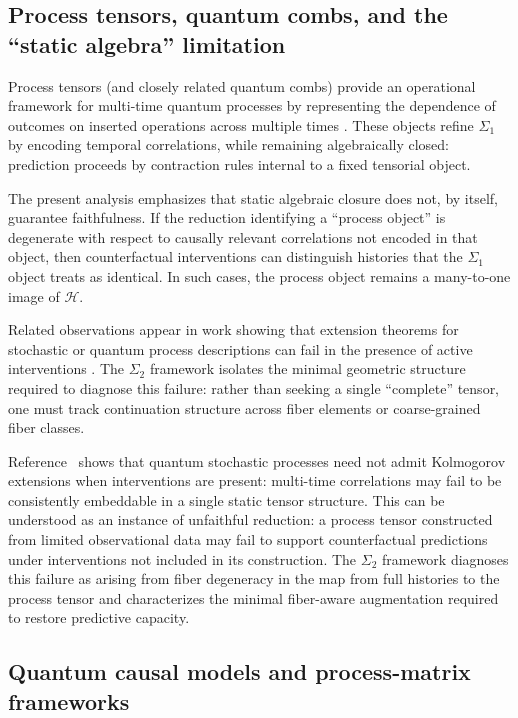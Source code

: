 \subsection{Process tensors, quantum combs, and the ``static algebra'' limitation}
\label{sec:process-tensors}

Process tensors (and closely related quantum combs) provide an operational framework for
multi-time quantum processes by representing the dependence of outcomes on inserted operations
across multiple times \cite{Pollock2018PRA,Pollock2018PRL,Chiribella2009PRA,Chiribella2008PRL}.
These objects refine $\Sigma_1$ by encoding temporal correlations, while remaining algebraically
closed: prediction proceeds by contraction rules internal to a fixed tensorial object.

The present analysis emphasizes that static algebraic closure does not, by itself, guarantee
faithfulness. If the reduction identifying a ``process object'' is degenerate with respect to
causally relevant correlations not encoded in that object, then counterfactual interventions
can distinguish histories that the $\Sigma_1$ object treats as identical. In such cases, the
process object remains a many-to-one image of $\mathcal{H}$.

Related observations appear in work showing that extension theorems for stochastic or quantum
process descriptions can fail in the presence of active interventions \cite{Milz2020Quantum}.
The $\Sigma_2$ framework isolates the minimal geometric structure required to diagnose this
failure: rather than seeking a single ``complete'' tensor, one must track continuation
structure across fiber elements or coarse-grained fiber classes.

Reference~\cite{Milz2020Quantum} shows that quantum stochastic processes need not admit
Kolmogorov extensions when interventions are present: multi-time correlations may fail to be
consistently embeddable in a single static tensor structure. This can be understood as an
instance of unfaithful reduction: a process tensor constructed from limited observational data
may fail to support counterfactual predictions under interventions not included in its
construction. The $\Sigma_2$ framework diagnoses this failure as arising from fiber degeneracy in
the map from full histories to the process tensor and characterizes the minimal fiber-aware
augmentation required to restore predictive capacity.

\subsection{Quantum causal models and process-matrix frameworks}
\label{sec:causal}

